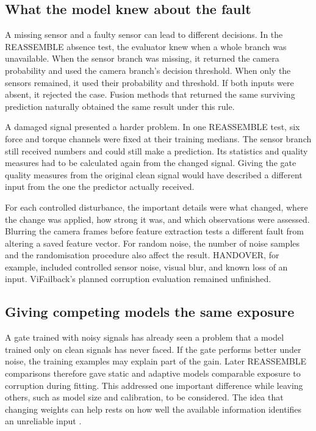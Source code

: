 \subsection{What the model knew about the fault}

A missing sensor and a faulty sensor can lead to different decisions. In the REASSEMBLE
absence test, the evaluator knew when a whole branch was unavailable. When the sensor
branch was missing, it returned the camera probability and used the camera branch’s
decision threshold. When only the sensors remained, it used their probability and
threshold. If both inputs were absent, it rejected the case. Fusion methods that
returned the same surviving prediction naturally obtained the same result under this
rule.

A damaged signal presented a harder problem. In one REASSEMBLE test, six force and
torque channels were fixed at their training medians. The sensor branch still received
numbers and could still make a prediction. Its statistics and quality measures had to be
calculated again from the changed signal. Giving the gate quality measures from the
original clean signal would have described a different input from the one the predictor
actually received.

For each controlled disturbance, the important details were what changed, where the
change was applied, how strong it was, and which observations were assessed. Blurring
the camera frames before feature extraction tests a different fault from altering a
saved feature vector. For random noise, the number of noise samples and the
randomisation procedure also affect the result. HANDOVER, for example, included
controlled sensor noise, visual blur, and known loss of an input. ViFailback’s planned
corruption evaluation remained unfinished.

\subsection{Giving competing models the same exposure}

A gate trained with noisy signals has already seen a problem that a model trained only
on clean signals has never faced. If the gate performs better under noise, the training
examples may explain part of the gain. Later REASSEMBLE comparisons therefore gave
static and adaptive models comparable exposure to corruption during fitting. This
addressed one important difference while leaving others, such as model size and
calibration, to be considered. The idea that changing weights can help rests on how well
the available information identifies an unreliable input \parencite{Zhang2023QMF}.

